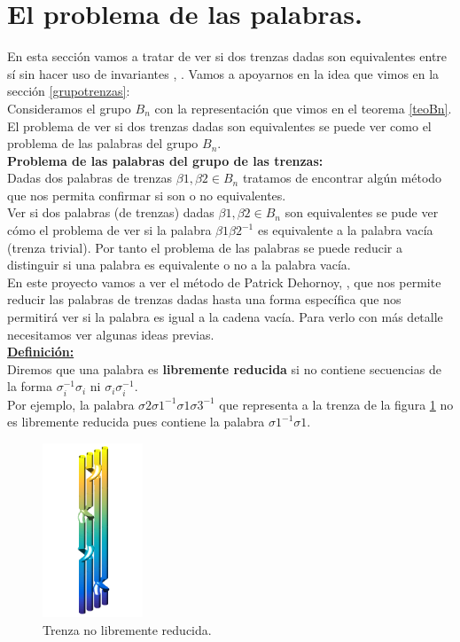 \section{El problema de las palabras.}\label{deh}
En esta sección vamos a tratar de ver si dos trenzas dadas son equivalentes entre sí sin hacer uso de invariantes \cite{4}, \cite{11}. Vamos a apoyarnos en la idea que vimos en la sección \ref{grupotrenzas}:\\

Consideramos el grupo $ B_{n} $ con la representación que vimos en el teorema \ref{teoBn}. El problema de ver si dos trenzas dadas son equivalentes se puede ver como el problema de las palabras del grupo $ B_{n} $.\\

\textbf{Problema de las palabras del grupo de las trenzas:}\\
Dadas dos palabras de trenzas $\beta1, \beta2 \in B_{n}$ tratamos de encontrar algún método que nos permita confirmar si son o no equivalentes. \\

Ver si dos palabras (de trenzas) dadas $\beta1, \beta2 \in B_{n}$ son equivalentes se pude ver cómo el problema de ver si la palabra $\beta1\beta2^{-1}$ es equivalente a la palabra vacía (trenza trivial). Por tanto el problema de las palabras se puede reducir a distinguir si una palabra es equivalente o no a la palabra vacía. \\

En este proyecto vamos a ver el método de Patrick Dehornoy, \cite{4}, que nos permite reducir las palabras de trenzas dadas hasta una forma específica que nos permitirá ver si la palabra es igual a la cadena vacía. Para verlo con más detalle necesitamos ver algunas ideas previas.\\

\underline{\textbf{Definición:}}\\
Diremos que una palabra es \textbf{libremente reducida} si no contiene secuencias de la forma $\sigma_{i}^{-1}\sigma_{i} $ ni $\sigma_{i}\sigma_{i}^{-1}$.\\

Por ejemplo, la palabra $\sigma2\sigma1^{-1}\sigma1\sigma3^{-1}$ que representa a la trenza de la figura \ref{deh1} no es libremente reducida pues contiene la palabra $\sigma1^{-1}\sigma1$.\\

	\begin{figure}[h!]
		\centering
		\includegraphics[width=3cm]{itrenzas/deh1.png}
		\caption{Trenza no libremente reducida.}
		\label{deh1} 
	\end{figure}

